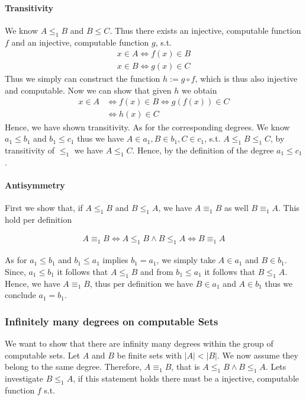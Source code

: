 \documentclass[11pt,a4paper]{article}
\begin{document}
\paragraph{Transitivity} 
We know $A \leq_1 B$ and $B \leq C$. Thus there exists an injective, computable function $f$ and
an injective, computable function $g$, s.t.
\begin{equation*}
\begin{split}
x \in A  \iff f(x) \in B \\
x \in B  \iff g(x) \in C
\end{split}
\end{equation*}
Thus we simply can construct the function $h:= g \circ f$, which is thus also injective and computable.
Now we can show that given $h$ we obtain
\begin{equation*}
\begin{split}
x \in A  & \iff f(x) \in B  \iff g(f(x)) \in C \\
& \iff h(x) \in C
\end{split}
\end{equation*}
Hence, we have shown transitivity. As for the corresponding degrees.  
We know $a_1 \leq b_1$ and $b_1 \leq c_1$ thus we have $A \in a_1, B \in b_1, C \in c_1$, s.t.
$A \leq_1 B \leq_1 C$, by transitivity of $\leq_1$ we have $A \leq_1 C$. Hence, by the definition of the degree 
$a_1 \leq c_1$.

\paragraph{Antisymmetry} 
First we show that, if $A \leq_1 B$ and $B \leq_1 A$, we have $A \equiv_1 B$ as well $B \equiv_1 A$.
This hold per definition 

\begin{equation*}
\begin{split}
A \equiv_1 B \iff A \leq_1 B \wedge B \leq_1 A \iff B \equiv_1 A
\end{split}
\end{equation*}

As for $a_1 \leq b_1$ and $b_1 \leq a_1$ implies $b_1 = a_1$, we simply take $A \in a_1$ and $B \in b_1$.
Since, $a_1 \leq b_1$ it follows that $A \leq_1 B$ and from $b_1 \leq a_1$ it follows that $B \leq_1 A$. 
Hence, we have $A \equiv_1 B$, thus per definition we have $B \in a_1$ and $A \in b_1$ thus we conclude $a_1 = b_1$.

\subsubsection*{Infinitely many degrees on computable Sets}
We want to show that there are infinity many degrees within the group of computable sets. 
Let $A$ and $B$ be finite sets with $|A|<|B|$.
We now assume they belong to the same degree. Therefore, $A \equiv_1 B$, that is $A \leq_1 B \wedge B \leq_1 A$.
Lets investigate $B \leq_1 A$, if this statement holds there must be a injective, computable function $f$ s.t.
\end{document}
